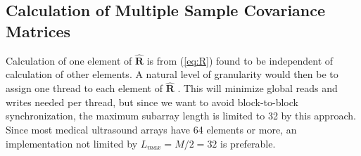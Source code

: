 \documentclass[journal]{IEEEtran}
\newcommand{\mat}[1]{\mathbf{#1}}
\newcommand{\R}{$\mat{\hat{R}}$ }
\begin{document}


\subsection{Calculation of Multiple Sample Covariance Matrices}\label{sec:calcR}


Calculation of one element of \R is from (\ref{eq:R}) found to be independent of calculation of other elements. A natural level of granularity would then be to assign one thread to each element of $\mat{\hat{R}}$ \cite{Chen2011}. This will minimize global reads and writes needed per thread, but since we want to avoid block-to-block synchronization, the maximum subarray length is limited to 32 by this approach. Since most medical ultrasound arrays have 64 elements or more, an implementation not limited by $L_{max}=M/2=32$ is preferable.
\end{document}
